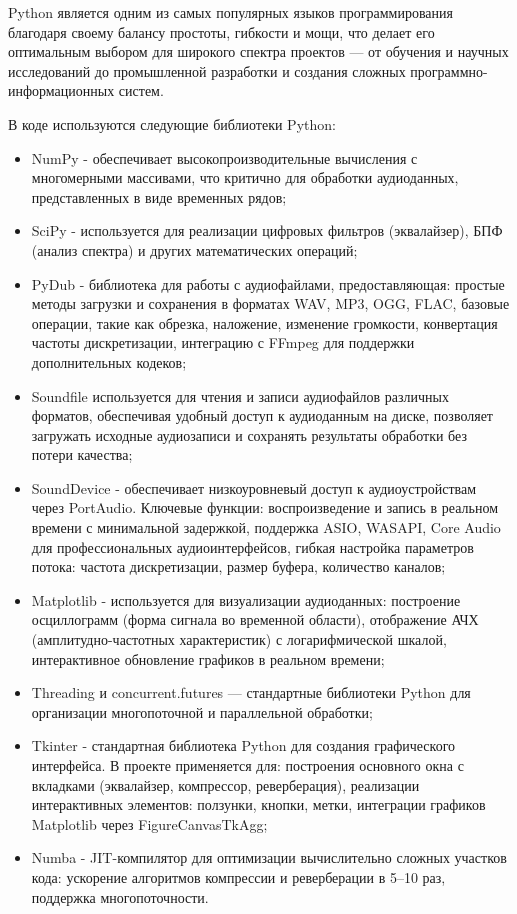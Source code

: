 Python является одним из самых популярных языков программирования благодаря своему балансу простоты, гибкости и мощи, что делает его оптимальным выбором для широкого спектра проектов — от обучения и научных исследований до промышленной разработки и создания сложных программно-информационных систем.

В коде используются следующие библиотеки Python:
\begin{itemize}
	\item NumPy - обеспечивает высокопроизводительные вычисления с многомерными массивами, что критично для обработки аудиоданных, представленных в виде временных рядов;
	\item SciPy - используется для реализации цифровых фильтров (эквалайзер), БПФ (анализ спектра) и других математических операций;
	\item PyDub - библиотека для работы с аудиофайлами, предоставляющая: простые методы загрузки и сохранения в форматах WAV, MP3, OGG, FLAC, базовые операции, такие как обрезка, наложение, изменение громкости, конвертация частоты дискретизации, интеграцию с FFmpeg для поддержки дополнительных кодеков;
	\item Soundfile используется для чтения и записи аудиофайлов различных форматов, обеспечивая удобный доступ к аудиоданным на диске, позволяет загружать исходные аудиозаписи и сохранять результаты обработки без потери качества;
	\item SoundDevice - обеспечивает низкоуровневый доступ к аудиоустройствам через PortAudio. Ключевые функции: воспроизведение и запись в реальном времени с минимальной задержкой, поддержка ASIO, WASAPI, Core Audio для профессиональных аудиоинтерфейсов, гибкая настройка параметров потока: частота дискретизации, размер буфера, количество каналов;
	\item Matplotlib - используется для визуализации аудиоданных: построение осциллограмм (форма сигнала во временной области), отображение АЧХ (амплитудно-частотных характеристик) с логарифмической шкалой, интерактивное обновление графиков в реальном времени;
	\item Threading и concurrent.futures — стандартные библиотеки Python для организации многопоточной и параллельной обработки;
	\item Tkinter - стандартная библиотека Python для создания графического интерфейса. В проекте применяется для: построения основного окна с вкладками (эквалайзер, компрессор, реверберация), реализации интерактивных элементов: ползунки, кнопки, метки, интеграции графиков Matplotlib через FigureCanvasTkAgg;
	\item Numba - JIT-компилятор для оптимизации вычислительно сложных участков кода: ускорение алгоритмов компрессии и реверберации в 5–10 раз, поддержка многопоточности.
\end{itemize}

